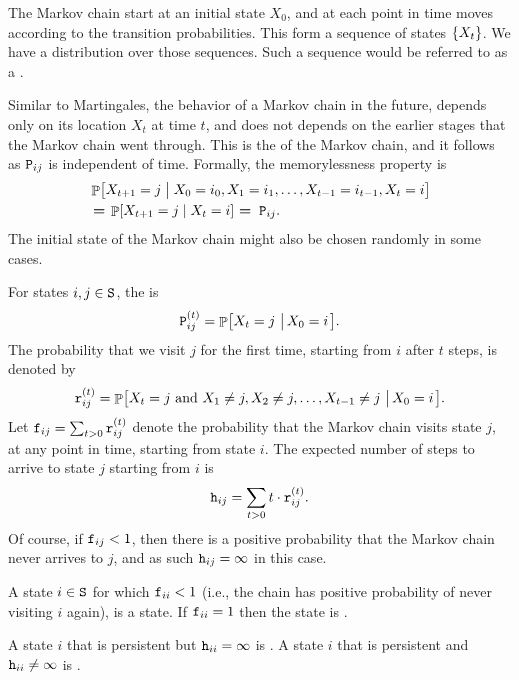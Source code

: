 The Markov chain start at an initial state $X_0$, and at each point in
time moves according to the transition probabilities. This form a
sequence of states $\left\{ {X_t} \right\}$. We have a distribution over those
sequences. Such a sequence would be referred to as a .

Similar to Martingales, the behavior of a Markov chain in the future,
depends only on its location $X_t$ at time $t$, and does not depends
on the earlier stages that the Markov chain went through. This is the
 of the Markov chain, and it follows as
$\mathtt{P}_{ij}$ is independent of time. Formally, the memorylessness
property is
\begin{align*}
    &\ProbCond{\bigl.X_{t+1} =j }{ X_0 = i_0, X_1 = i_1, \ldots, X_{t-1} =
       i_{t-1} , X_t = i }%
    \\&\boldsymbol{=}\ts\ts%
    \ProbCond{X_{t+1} =j}{ X_t = i}%
    \ts\boldsymbol{=}\;%
    \MCPrb_{ij}.
\end{align*}
The initial state of the Markov chain might also be chosen randomly in
some cases.

For states $i,j \in \mathtt{S}$, the  is
\[
\MCPrbT{i}{j}{t} = \Prob{X_t = j \sep{ X_0 =
      i}}.
\]
The probability that we visit $j$ for the first time,
starting from $i$ after $t$ steps, is denoted by
\begin{equation*}
    \MCFPrbT{i}{j}{t} = \Prob{X_t = j \text{ and } X_1 \ne j, X_2 \ne
       j, \ldots, X_{t-1}\ne j \sep{ X_0 = i}}.
\end{equation*}
Let $\mathtt{f}_{ij} = \sum_{t>0} \mathtt{r}_{ij}^{(t)}$ denote the
probability that the Markov chain visits state $j$, at any point in
time, starting from state $i$. The expected number of steps to arrive
to state $j$ starting from $i$ is
\begin{equation*}
    \mathtt{h}_{ij} = \sum_{t >0} t\cdot \mathtt{r}_{ij}^{(t)}.
\end{equation*}
Of course, if $\mathtt{f}_{ij} <1$, then there is a positive
probability that the Markov chain never arrives to $j$, and as such
$\mathtt{h}_{ij} = \infty$ in this case.

\begin{defn}
    A state $i \in \mathtt{S}$ for which $\mathtt{f}_{ii} < 1$ (i.e., the
    chain has positive probability of never visiting $i$ again), is a
     state. If $\mathtt{f}_{ii}=1$
    then the state is .
    
    A state $i$ that is persistent but $\mathtt{h}_{ii} = \infty$ is
    . A state $i$ that
    is persistent and $\mathtt{h}_{ii} \ne \infty$ is .
\end{defn}

